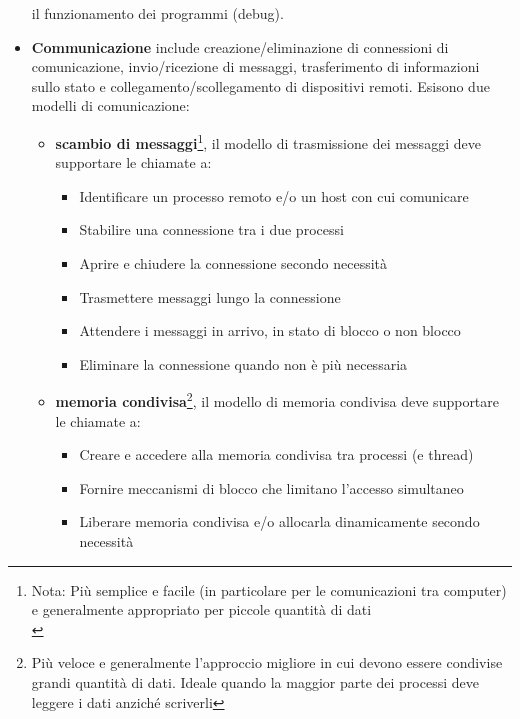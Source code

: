 \documentclass{article}
\begin{document}
\begin{itemize}
    il funzionamento dei programmi (debug). 
    \item \textbf{Communicazione} include creazione/eliminazione di connessioni di comunicazione, invio/ricezione di messaggi, trasferimento di informazioni sullo stato e collegamento/scollegamento di dispositivi remoti. Esisono due modelli di comunicazione: 
    \begin{itemize}
        \item \textbf{scambio di messaggi}\footnote{Nota: Più semplice e facile (in particolare per le comunicazioni tra computer) e generalmente appropriato per piccole quantità di dati\\}, il modello di trasmissione dei messaggi deve supportare le chiamate a:
        \begin{itemize}
            \item Identificare un processo remoto e/o un host con cui comunicare
            \item Stabilire una connessione tra i due processi
            \item Aprire e chiudere la connessione secondo necessità
            \item Trasmettere messaggi lungo la connessione
            \item Attendere i messaggi in arrivo, in stato di blocco o non blocco
            \item Eliminare la connessione quando non è più necessaria
        \end{itemize}
        \item \textbf{memoria condivisa}\footnote{Più veloce e generalmente l'approccio migliore in cui devono essere condivise grandi quantità di dati. Ideale quando la maggior parte dei processi deve leggere i dati anziché scriverli}, il modello di memoria condivisa deve supportare le chiamate a:
        \begin{itemize}
            \item  Creare e accedere alla memoria condivisa tra processi (e thread) 
            \item Fornire meccanismi di blocco che limitano l'accesso simultaneo
            \item Liberare memoria condivisa e/o allocarla dinamicamente secondo necessità
        \end{itemize}
    \end{itemize}
\end{itemize}
\end{document}
